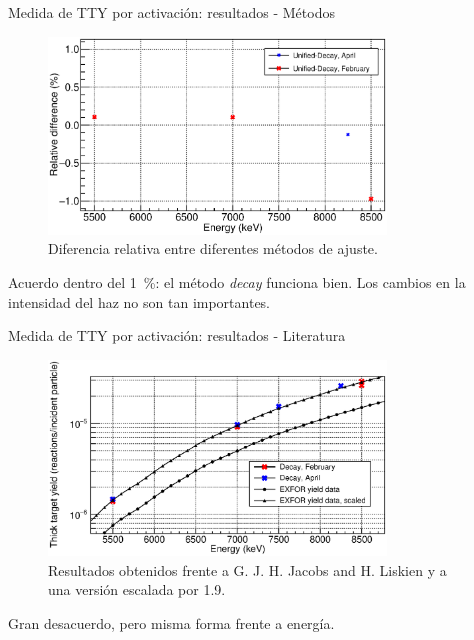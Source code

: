 \documentclass[11pt]{beamer}
\begin{document}
\begin{frame}{Medida de TTY por activación: resultados - Métodos}
	\begin{figure}[H]
		\centering
		\includegraphics[width=0.80\textwidth]{activation_method_comparison.eps}
		\caption{Diferencia relativa entre diferentes métodos de ajuste.}
		\label{activation_method_comparison}
	\end{figure}
	Acuerdo dentro del \qty{1}{\percent}: el método \textit{decay} funciona bien.
	Los cambios en la intensidad del haz no son tan importantes.
\end{frame}

\begin{frame}{Medida de TTY por activación: resultados - Literatura}
	\begin{figure}[H]
		\centering
		\includegraphics[width=0.80\textwidth]{activation_final_results.eps}
		\caption{Resultados obtenidos frente a G. J. H. Jacobs and H. Liskien \cite{jacobs} y a una versión escalada por \num{1.9}.}
		\label{activation_final_results}
	\end{figure}
	Gran desacuerdo, pero misma forma frente a energía.
\end{frame}
\end{document}

